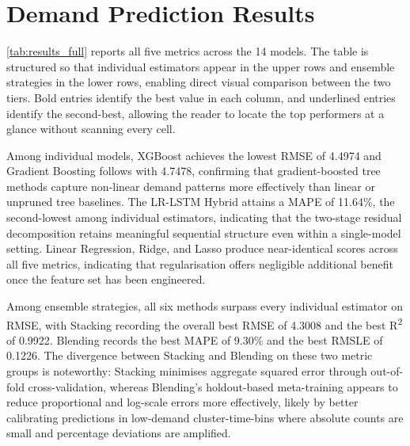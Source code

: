 \section{Demand Prediction Results}

\autoref{tab:results_full} reports all five metrics across the 14 models. The table is structured so that individual estimators appear in the upper rows and ensemble strategies in the lower rows, enabling direct visual comparison between the two tiers. Bold entries identify the best value in each column, and underlined entries identify the second-best, allowing the reader to locate the top performers at a glance without scanning every cell.

Among individual models, XGBoost achieves the lowest RMSE of 4.4974 and Gradient Boosting follows with 4.7478, confirming that gradient-boosted tree methods capture non-linear demand patterns more effectively than linear or unpruned tree baselines. The LR-LSTM Hybrid attains a MAPE of 11.64\%, the second-lowest among individual estimators, indicating that the two-stage residual decomposition retains meaningful sequential structure even within a single-model setting. Linear Regression, Ridge, and Lasso produce near-identical scores across all five metrics, indicating that regularisation offers negligible additional benefit once the feature set has been engineered.

Among ensemble strategies, all six methods surpass every individual estimator on RMSE, with Stacking recording the overall best RMSE of 4.3008 and the best R\textsuperscript{2} of 0.9922. Blending records the best MAPE of 9.30\% and the best RMSLE of 0.1226. The divergence between Stacking and Blending on these two metric groups is noteworthy: Stacking minimises aggregate squared error through out-of-fold cross-validation, whereas Blending's holdout-based meta-training appears to reduce proportional and log-scale errors more effectively, likely by better calibrating predictions in low-demand cluster-time-bins where absolute counts are small and percentage deviations are amplified.

